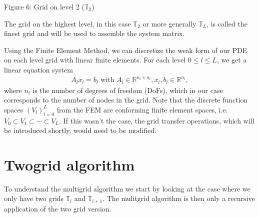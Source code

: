 \documentclass[letterpaper,10pt,english, openany]{sphinxmanual}
\begin{document}
\begin{center}Figure 6: Grid on level 2 (\(\mathbb{T}_2\))
\end{center}
The grid on the highest level, in this case \(\mathbb{T}_2\) or more generally \(\mathbb{T}_L\), is called the finest grid
and will be used to assemble the system matrix.

Using the Finite Element Method, we can discretize the weak form of our PDE on each level grid
with linear finite elements. For each level \(0 \leq l \leq L\), we get a linear equation system
\begin{equation*}
\begin{split}A_l x_l = b_l \text{  with  } A_l \in \mathbb{R}^{n_l \times n_l}, x_l, b_l \in \mathbb{R}^{n_l},\end{split}
\end{equation*}
where \(n_l\) is the number of degrees of freedom (DoFs), which in our case corresponds to the number of nodes in the grid.
Note that the discrete function spaces \(\left( V_l \right)_{l=0}^L\) from the FEM are conforming finite element spaces,
i.e. \(V_0 \subset V_1 \subset \cdots \subset V_L\). If this wasn’t the case, the grid transfer operations, which will be introduced shortly, would need to be modified.


\section{Two\sphinxhyphen{}grid algorithm}
\label{\detokenize{basics:two-grid-algorithm}}
To understand the multigrid algorithm we start by looking at the case where we only have two grids \(\mathbb{T}_{l}\) and \(\mathbb{T}_{l+1}\).
The mulitgrid algorithm is then only a recursive application of the two grid version.
\end{document}
